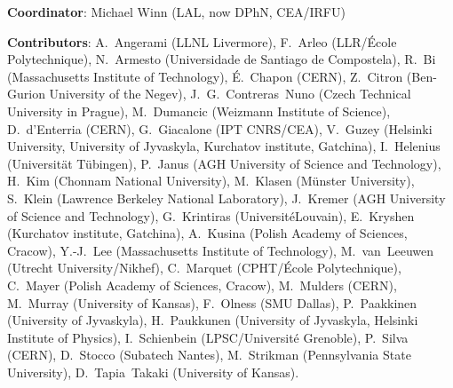{ \small
\noindent \textbf{Coordinator}: Michael Winn (LAL, now DPhN, CEA/IRFU) %

\noindent \textbf{Contributors}:
A.~Angerami (LLNL Livermore), %
F.~Arleo (LLR/{\'E}cole Polytechnique), %
N.~Armesto (Universidade de Santiago de Compostela), %
R.~Bi (Massachusetts Institute of Technology), %
{\'E}.~Chapon (CERN), %
Z.~Citron (Ben-Gurion University of the Negev), %
J.~G.~Contreras~Nuno (Czech Technical University in Prague),  %
M.~Dumancic (Weizmann Institute of Science),
D.~d'Enterria (CERN), %
G.~Giacalone (IPT CNRS/CEA), %
V.~Guzey (Helsinki University, University of Jyvaskyla, Kurchatov institute, Gatchina),%
I.~Helenius (Universit\"{a}t T\"{u}bingen), %
P.~Janus (AGH University of Science and Technology),
H.~Kim (Chonnam National University), 
M.~Klasen (M\"{u}nster University), %
S.~Klein (Lawrence Berkeley National Laboratory), %
J.~Kremer (AGH University of Science and Technology),
G.~Krintiras (Universit\'{e}Louvain),
E.~Kryshen (Kurchatov institute, Gatchina), %
A.~Kusina (Polish Academy of Sciences, Cracow), %
Y.-J.~Lee (Massachusetts Institute of Technology), %
M.~van~Leeuwen (Utrecht University/Nikhef), %
C.~Marquet (CPHT/{\'E}cole Polytechnique), %
C.~Mayer (Polish Academy of Sciences, Cracow), %
M.~Mulders (CERN),
M.~Murray (University of Kansas), %
F.~Olness (SMU Dallas), %
P.~Paakkinen (University of Jyvaskyla), %
H.~Paukkunen (University of Jyvaskyla, Helsinki Institute of Physics), %
I.~Schienbein (LPSC/Universit{\'e} Grenoble),
P.~Silva (CERN), %
D.~Stocco (Subatech Nantes), %
M.~Strikman (Pennsylvania State University), %
D.~Tapia~Takaki (University of Kansas). %
}

